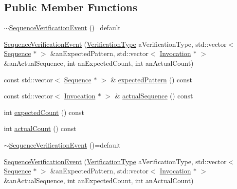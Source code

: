 \subsection*{Public Member Functions}
\begin{DoxyCompactItemize}
\item 
\mbox{\hyperlink{structfakeit_1_1SequenceVerificationEvent_a8f8e45c2407802e200befa82790c5e13}{$\sim$\+Sequence\+Verification\+Event}} ()=default
\item 
\mbox{\hyperlink{structfakeit_1_1SequenceVerificationEvent_ab0842bb20a84757c265ecdee00f41c91}{Sequence\+Verification\+Event}} (\mbox{\hyperlink{namespacefakeit_a9df22520dd60badb149c1d1d2518b253}{Verification\+Type}} a\+Verification\+Type, std\+::vector$<$ \mbox{\hyperlink{classfakeit_1_1Sequence}{Sequence}} $\ast$ $>$ \&an\+Expected\+Pattern, std\+::vector$<$ \mbox{\hyperlink{structfakeit_1_1Invocation}{Invocation}} $\ast$ $>$ \&an\+Actual\+Sequence, int an\+Expected\+Count, int an\+Actual\+Count)
\item 
const std\+::vector$<$ \mbox{\hyperlink{classfakeit_1_1Sequence}{Sequence}} $\ast$ $>$ \& \mbox{\hyperlink{structfakeit_1_1SequenceVerificationEvent_a2d3fb35082acdadfe2be2a4d69c94189}{expected\+Pattern}} () const
\item 
const std\+::vector$<$ \mbox{\hyperlink{structfakeit_1_1Invocation}{Invocation}} $\ast$ $>$ \& \mbox{\hyperlink{structfakeit_1_1SequenceVerificationEvent_aecdc4dac839dc16a96ee85b0d0297bed}{actual\+Sequence}} () const
\item 
int \mbox{\hyperlink{structfakeit_1_1SequenceVerificationEvent_ad0970b6b1b3b3d122e0494e95c6a00eb}{expected\+Count}} () const
\item 
int \mbox{\hyperlink{structfakeit_1_1SequenceVerificationEvent_a4f7daa947cca317c30e74ee66540d3b9}{actual\+Count}} () const
\item 
\mbox{\hyperlink{structfakeit_1_1SequenceVerificationEvent_a8f8e45c2407802e200befa82790c5e13}{$\sim$\+Sequence\+Verification\+Event}} ()=default
\item 
\mbox{\hyperlink{structfakeit_1_1SequenceVerificationEvent_ab0842bb20a84757c265ecdee00f41c91}{Sequence\+Verification\+Event}} (\mbox{\hyperlink{namespacefakeit_a9df22520dd60badb149c1d1d2518b253}{Verification\+Type}} a\+Verification\+Type, std\+::vector$<$ \mbox{\hyperlink{classfakeit_1_1Sequence}{Sequence}} $\ast$ $>$ \&an\+Expected\+Pattern, std\+::vector$<$ \mbox{\hyperlink{structfakeit_1_1Invocation}{Invocation}} $\ast$ $>$ \&an\+Actual\+Sequence, int an\+Expected\+Count, int an\+Actual\+Count)

\end{DoxyCompactItemize}
